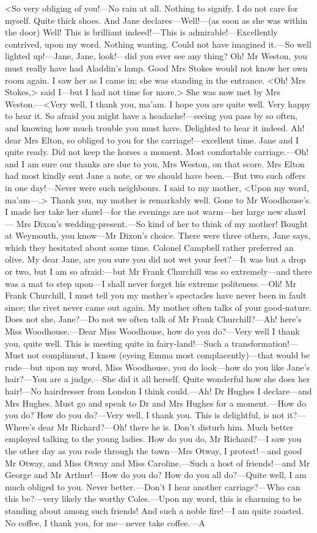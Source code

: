 <So very obliging of you!—No rain at all. Nothing to signify. I do not care for myself. Quite thick shoes. And Jane declares—Well!—(as soon as she was within the door) Well! This is brilliant indeed!—This is admirable!—Excellently contrived, upon my word. Nothing wanting. Could not have imagined it.—So well lighted up!—Jane, Jane, look!—did you ever see any thing? Oh! Mr Weston, you must really have had Aladdin's lamp. Good Mrs Stokes would not know her own room again. I saw her as I came in; she was standing in the entrance. <Oh! Mrs Stokes,> said I—but I had not time for more.> She was now met by Mrs Weston.—<Very well, I thank you, ma'am. I hope you are quite well. Very happy to hear it. So afraid you might have a headache!—seeing you pass by so often, and knowing how much trouble you must have. Delighted to hear it indeed. Ah! dear Mrs Elton, so obliged to you for the carriage!—excellent time. Jane and I quite ready. Did not keep the horses a moment. Most comfortable carriage.—Oh! and I am sure our thanks are due to you, Mrs Weston, on that score. Mrs Elton had most kindly sent Jane a note, or we should have been.—But two such offers in one day!—Never were such neighbours. I said to my mother, <Upon my word, ma'am—.> Thank you, my mother is remarkably well. Gone to Mr Woodhouse's. I made her take her shawl—for the evenings are not warm—her large new shawl— Mrs Dixon's wedding-present.—So kind of her to think of my mother! Bought at Weymouth, you know—Mr Dixon's choice. There were three others, Jane says, which they hesitated about some time. Colonel Campbell rather preferred an olive. My dear Jane, are you sure you did not wet your feet?—It was but a drop or two, but I am so afraid:—but Mr Frank Churchill was so extremely—and there was a mat to step upon—I shall never forget his extreme politeness.—Oh! Mr Frank Churchill, I must tell you my mother's spectacles have never been in fault since; the rivet never came out again. My mother often talks of your good-nature. Does not she, Jane?—Do not we often talk of Mr Frank Churchill?—Ah! here's Miss Woodhouse.—Dear Miss Woodhouse, how do you do?—Very well I thank you, quite well. This is meeting quite in fairy-land!—Such a transformation!—Must not compliment, I know (eyeing Emma most complacently)—that would be rude—but upon my word, Miss Woodhouse, you do look—how do you like Jane's hair?—You are a judge.—She did it all herself. Quite wonderful how she does her hair!—No hairdresser from London I think could.—Ah! Dr Hughes I declare—and Mrs Hughes. Must go and speak to Dr and Mrs Hughes for a moment.—How do you do? How do you do?—Very well, I thank you. This is delightful, is not it?—Where's dear Mr Richard?—Oh! there he is. Don't disturb him. Much better employed talking to the young ladies. How do you do, Mr Richard?—I saw you the other day as you rode through the town—Mrs Otway, I protest!—and good Mr Otway, and Miss Otway and Miss Caroline.—Such a host of friends!—and Mr George and Mr Arthur!—How do you do? How do you all do?—Quite well, I am much obliged to you. Never better.—Don't I hear another carriage?—Who can this be?—very likely the worthy Coles.—Upon my word, this is charming to be standing about among such friends! And such a noble fire!—I am quite roasted. No coffee, I thank you, for me—never take coffee.—A 